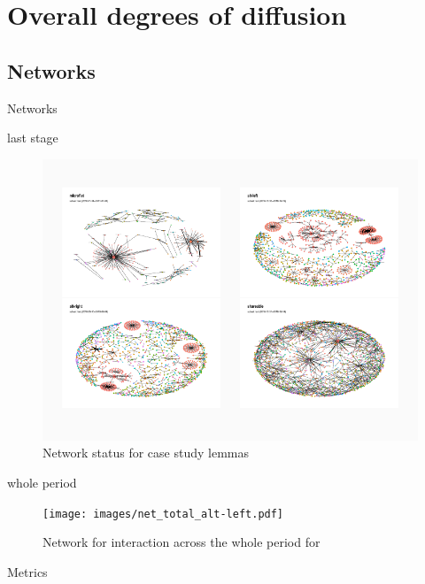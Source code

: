 \documentclass[
  a4paper,
  ]{scrartcl}
\begin{document}
\section{Overall degrees of diffusion}

  \subsection{Networks}


    Networks

      last stage

        \begin{figure}[H]
          \centering
          \includegraphics[width=\linewidth, height=.8\textheight, keepaspectratio]{images/net_cases_last.pdf}
          \caption{Network status for case study lemmas}
        \end{figure}

      whole period

        \begin{figure}[H]
          \centering
          \texttt{[image: images/net\_total\_alt-left.pdf]}
          \caption{Network for interaction across the whole period for }
        \end{figure}

    Metrics
\end{document}
